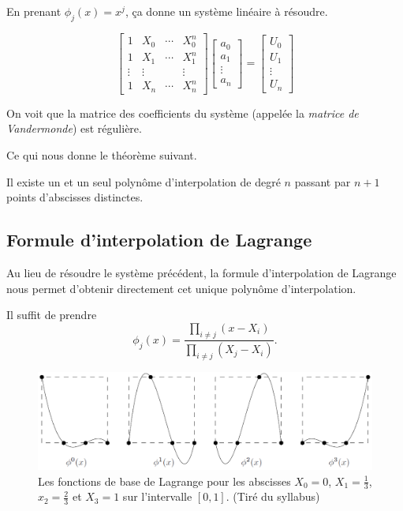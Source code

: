 En prenant $\phi_j(x) = x^j$, ça donne un système linéaire à résoudre.

\[\begin{bmatrix}
	1 			& X_0 		& \cdots & X_0^n  \\
	1 			& X_1 		& \cdots & X_1^n  \\
	\vdots	& \vdots 	& 			 & \vdots \\
	1 			& X_n 		& \cdots & X_n^n
\end{bmatrix}
\begin{bmatrix}
	a_0 			\\
	a_1 			\\
	\vdots	\\
	a_n 			
\end{bmatrix}
=
\begin{bmatrix}
	U_0 			\\
	U_1 			\\
	\vdots	\\
	U_n 			
\end{bmatrix}\]

On voit que la matrice des coefficients du système (appelée la \textit{matrice
de Vandermonde}) est régulière.

Ce qui nous donne le théorème suivant.
\begin{mytheo}
  Il existe un et un seul polynôme d'interpolation de degré $n$ passant
  par $n+1$ points d'abscisses distinctes.
\end{mytheo}

\subsection{Formule d'interpolation de Lagrange}
Au lieu de résoudre le système précédent, la formule d'interpolation
de Lagrange nous permet d'obtenir directement cet unique polynôme
d'interpolation.

Il suffit de prendre 
\[
  \phi_j(x) = \frac{\prod_{i \neq j} (x - X_i)}
  {\prod_{i \neq j} (X_j - X_i)}.
\]

\begin{figure}[ht]
	\centering
	\includegraphics[scale=0.6]{fonctions_lagrange.png}
	\caption{Les fonctions de base de Lagrange pour les abscisses $X_0 = 0$, 
	$X_1 = \frac{1}{3}$, $x_2 = \frac{2}{3}$ et $X_3 = 1$ sur l'intervalle 
	$[0,1]$. (Tiré du syllabus)}
	\label{fig:lagrange}
\end{figure}


